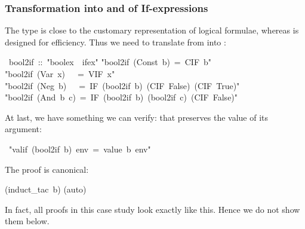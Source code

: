 \begin{isabelle}
\begin{isamarkuptext}
\subsubsection{Transformation into and of If-expressions}

The type  is close to the customary representation of logical
formulae, whereas  is designed for efficiency. Thus we need to
translate from  into :%
\end{isamarkuptext}%
~bool2if~::~{"}boolex~{\isasymRightarrow}~ifex{"}\isanewline
{}\isanewline
{"}bool2if~(Const~b)~=~CIF~b{"}\isanewline
{"}bool2if~(Var~x)~~~=~VIF~x{"}\isanewline
{"}bool2if~(Neg~b)~~~=~IF~(bool2if~b)~(CIF~False)~(CIF~True){"}\isanewline
{"}bool2if~(And~b~c)~=~IF~(bool2if~b)~(bool2if~c)~(CIF~False){"}%
\begin{isamarkuptext}%
\noindent
At last, we have something we can verify: that  preserves the
value of its argument:%
\end{isamarkuptext}%
~{"}valif~(bool2if~b)~env~=~value~b~env{"}%
\begin{isamarkuptxt}%
\noindent
The proof is canonical:%
\end{isamarkuptxt}%
(induct\_tac~b)\isanewline
{}(auto)%
\begin{isamarkuptext}%
\noindent
In fact, all proofs in this case study look exactly like this. Hence we do
not show them below.


\end{isamarkuptext}
\end{isabelle}
